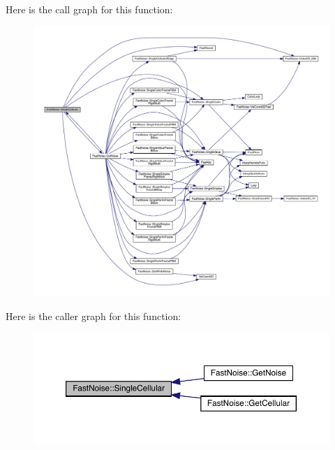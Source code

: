 Here is the call graph for this function\+:
\nopagebreak
\begin{figure}[H]
\begin{center}
\leavevmode
\includegraphics[width=350pt]{d1/dd8/class_fast_noise_a9729b73152368fb1c494bf4ab7cbe19e_cgraph}
\end{center}
\end{figure}
Here is the caller graph for this function\+:
\nopagebreak
\begin{figure}[H]
\begin{center}
\leavevmode
\includegraphics[width=350pt]{d1/dd8/class_fast_noise_a9729b73152368fb1c494bf4ab7cbe19e_icgraph}
\end{center}
\end{figure}
\mbox{\label{class_fast_noise_a0d55ad41a81a37df679a5ed92cef2d36}} 
